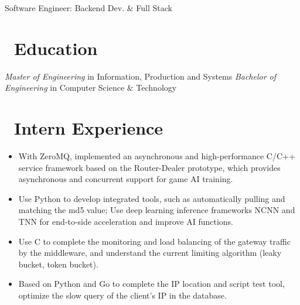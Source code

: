 \documentclass{resume}
\begin{document}


\vspace{-0.5ex}
\centerline{Software Engineer: Backend Dev. \& Full Stack}
\vspace{1ex}
\vspace{-1.5ex}
 
\section{\faGraduationCap\ Education}
\textit{Master of Engineering} in Information, Production and Systems
\vspace{-1ex}
\textit{Bachelor of Engineering} in Computer Science \& Technology
\vspace{-0.5ex}

\section{\faSitemap\ Intern Experience}
\begin{itemize}
  \item With ZeroMQ, implemented an asynchronous and high-performance C/C++ service framework based on the Router-Dealer prototype, which provides asynchronous and concurrent support for game AI training.
  \item Use Python to develop integrated tools, such as automatically pulling and matching the md5 value; Use deep learning inference frameworks NCNN and TNN for end-to-side acceleration and improve AI functions.
\end{itemize}
\vspace{-2ex}

\begin{itemize}
  \item Use C to complete the monitoring and load balancing of the gateway traffic by the middleware, and understand the current limiting algorithm (leaky bucket, token bucket).
  \item Based on Python and Go to complete the IP location and script test tool, optimize the slow query of the client's IP in the database.
\end{itemize}
\vspace{-1ex}
\end{document}
